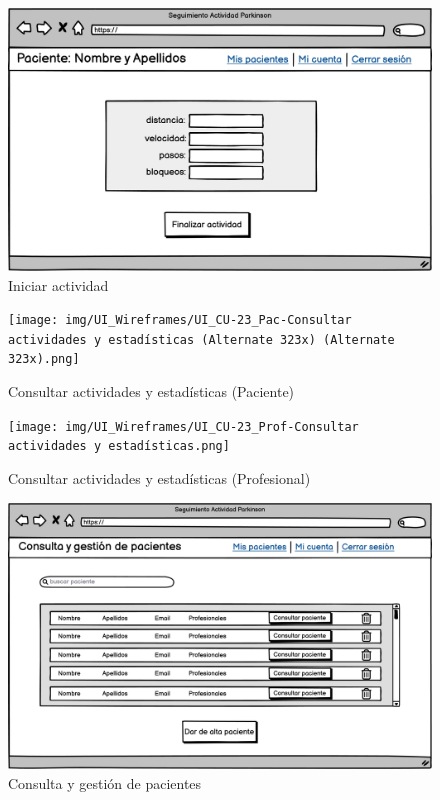 \begin{figure}[h]
    \centering
    \includegraphics[width=1\textwidth]{img/UI_Wireframes/UI_CU-19_Iniciar actividad.png}
    \caption{Iniciar actividad}
    \label{fig:Iniciar actividad}
\end{figure}

\begin{figure}[h]
    \centering
    \texttt{[image: img/UI\_Wireframes/UI\_CU-23\_Pac-Consultar actividades y estadísticas (Alternate 323x) (Alternate 323x).png]}
    \caption{Consultar actividades y estadísticas (Paciente)}
    \label{fig:Consultar actividades y estadísticas (Paciente)}
\end{figure}

\begin{figure}[h]
    \centering
    \texttt{[image: img/UI\_Wireframes/UI\_CU-23\_Prof-Consultar actividades y estadísticas.png]}
    \caption{Consultar actividades y estadísticas (Profesional)}
    \label{fig:Consultar actividades y estadísticas (Profesional)}
\end{figure}

\begin{figure}[h]
    \centering
    \includegraphics[width=1\textwidth]{img/UI_Wireframes/UI_CU-26_Consulta y gestion de pacientes.png}
    \caption{Consulta y gestión de pacientes}
    \label{fig:Consulta y gestión de pacientes}
\end{figure}

